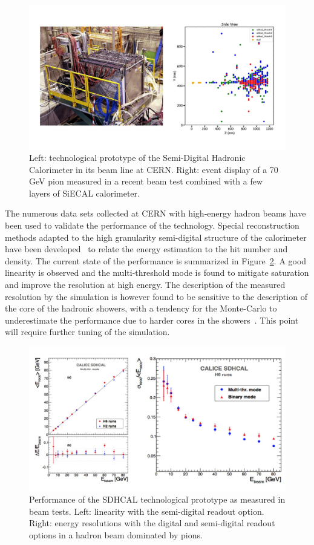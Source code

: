 \begin{figure}[t!]
\centering
\includegraphics[width=1.0\hsize]{Detector/fig/SDHCAL_proto.jpg}
\caption{Left: technological prototype of the Semi-Digital Hadronic Calorimeter in its beam line at CERN. Right: event display of a 70 GeV pion measured in a recent beam test combined with a few layers of SiECAL calorimeter.}
\label{fig:det:SDHCAL_proto}
\end{figure}

The numerous data sets collected at CERN with high-energy hadron beams have been used to validate the performance of the technology. Special reconstruction methods adapted to the high granularity semi-digital structure of the calorimeter have been developed~\cite{Buridon:2016ill} to relate the energy estimation to the hit number and density. The current state of the performance is summarized in Figure~\ref{fig:det:SDHCAL_perf}. A good linearity is observed and the multi-threshold mode is found to mitigate saturation and improve the resolution at high energy. The description of the measured resolution by the simulation is however found to be sensitive to the description of the core of the hadronic showers, with a tendency for the Monte-Carlo to underestimate the performance due to harder cores in the showers~\cite{Deng:2016obt}. This point will require further tuning of the simulation.

\begin{figure}[t!]
\centering
\includegraphics[width=1.0\hsize]{Detector/fig/SDHCAL_performance.jpg}
\caption{Performance of the SDHCAL technological prototype as measured in beam tests. Left: linearity with the semi-digital readout option. Right: energy resolutions with the digital and semi-digital readout options in a hadron beam dominated by pions.}
\label{fig:det:SDHCAL_perf}
\end{figure}

